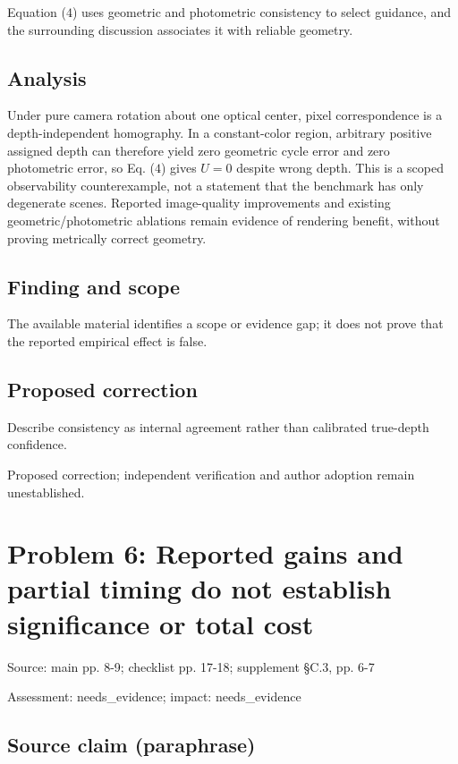 \documentclass[11pt]{article}
\begin{document}
Equation (\(4\)) uses geometric and photometric consistency to select guidance, and the surrounding discussion associates it with reliable geometry.

\subsection*{Analysis}

Under pure camera rotation about one optical center, pixel correspondence is a depth-independent homography. In a constant-color region, arbitrary positive assigned depth can therefore yield zero geometric cycle error and zero photometric error, so Eq. (\(4\)) gives \(U=0\) despite wrong depth. This is a scoped observability counterexample, not a statement that the benchmark has only degenerate scenes. Reported image-quality improvements and existing geometric/photometric ablations remain evidence of rendering benefit, without proving metrically correct geometry.

\subsection*{Finding and scope}

The available material identifies a scope or evidence gap; it does not prove that the reported empirical effect is false.

\subsection*{Proposed correction}

Describe consistency as internal agreement rather than calibrated true-depth confidence.

Proposed correction; independent verification and author adoption remain unestablished.

\section*{Problem 6: Reported gains and partial timing do not establish significance or total cost}

Source: main pp. 8-9; checklist pp. 17-18; supplement §C.3, pp. 6-7

Assessment: needs\_evidence; impact: needs\_evidence

\subsection*{Source claim (paraphrase)}
\end{document}
